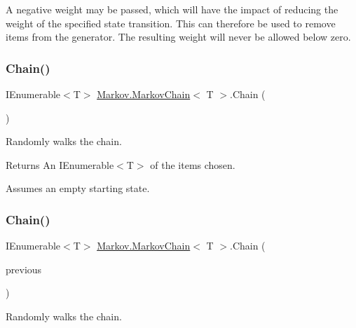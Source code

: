 A negative weight may be passed, which will have the impact of reducing the weight of the specified state transition. This can therefore be used to remove items from the generator. The resulting weight will never be allowed below zero. \mbox{\label{class_markov_1_1_markov_chain_a2748fc7f6e411bbbef965f4eaf7e5276}} 
\subsubsection{\texorpdfstring{Chain()}{Chain()}\hspace{0.1cm}{\footnotesize\ttfamily [1/6]}}
{\footnotesize\ttfamily I\+Enumerable$<$T$>$ \mbox{\hyperlink{class_markov_1_1_markov_chain}{Markov.\+Markov\+Chain}}$<$ T $>$.Chain (\begin{DoxyParamCaption}{ }\end{DoxyParamCaption})}



Randomly walks the chain. 

\begin{DoxyReturn}{Returns}
An I\+Enumerable$<$\+T$>$ of the items chosen.
\end{DoxyReturn}


Assumes an empty starting state.\mbox{\label{class_markov_1_1_markov_chain_a2a851d551132a3c0b986ffdc435d94fa}} 
\subsubsection{\texorpdfstring{Chain()}{Chain()}\hspace{0.1cm}{\footnotesize\ttfamily [2/6]}}
{\footnotesize\ttfamily I\+Enumerable$<$T$>$ \mbox{\hyperlink{class_markov_1_1_markov_chain}{Markov.\+Markov\+Chain}}$<$ T $>$.Chain (\begin{DoxyParamCaption}\item[{I\+Enumerable$<$ T $>$}]{previous }\end{DoxyParamCaption})}



Randomly walks the chain. 


